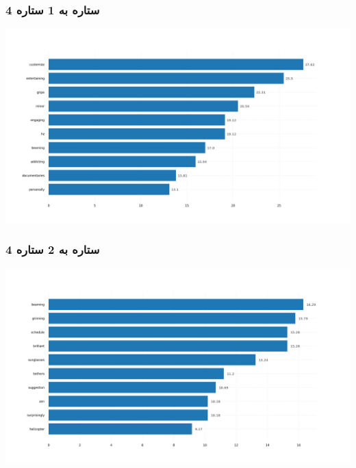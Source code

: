 \subsubsection{\Large 4 ستاره به 1 ستاره}
            { \selectfont \setLR
            \begin{center}
            \includegraphics[scale=0.4]{Images/rel_norm_freq_4_1.png}
            \end{center}
            \begin{adjustbox}{width=\textwidth}
            \end{adjustbox}
            }
\subsubsection{\Large 4 ستاره به 2 ستاره}
            { \selectfont \setLR
            \begin{center}
            \includegraphics[scale=0.4]{Images/rel_norm_freq_4_2.png}
            \end{center}
            \begin{adjustbox}{width=\textwidth}
            \end{adjustbox}
            }
